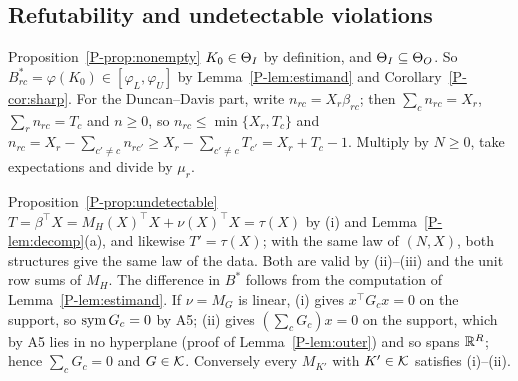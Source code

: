 \subsection{Refutability and undetectable violations}

\begin{proofof}{Proposition~\ref{P-prop:nonempty}}
$K_0\in\Theta_I$ by definition, and $\Theta_I\subseteq\Theta_O$. So
$B^*_{rc}=\varphi(K_0)\in[\varphi_L,\varphi_U]$ by Lemma~\ref{P-lem:estimand} and
Corollary~\ref{P-cor:sharp}. For the Duncan--Davis part, write $n_{rc}=X_r\beta_{rc}$;
then $\sum_cn_{rc}=X_r$, $\sum_rn_{rc}=T_c$ and $n\ge0$, so $n_{rc}\le\min\{X_r,T_c\}$
and $n_{rc}=X_r-\sum_{c'\ne c}n_{rc'}\ge X_r-\sum_{c'\ne c}T_{c'}=X_r+T_c-1$. Multiply
by $N\ge0$, take expectations and divide by $\mu_r$.
\end{proofof}

\begin{proofof}{Proposition~\ref{P-prop:undetectable}}
$T=\beta^\top X=M_H(X)^\top X+\nu(X)^\top X=\tau(X)$ by (i) and
Lemma~\ref{P-lem:decomp}(a), and likewise $T'=\tau(X)$; with the same law of $(N,X)$,
both structures give the same law of the data. Both are valid by (ii)--(iii) and the
unit row sums of $M_H$. The difference in $B^*$ follows from the computation of
Lemma~\ref{P-lem:estimand}. If $\nu=M_G$ is linear, (i) gives $x^\top G_cx=0$ on
the support, so $\operatorname{sym} G_c=0$ by A5; (ii) gives $(\sum_cG_c)x=0$ on the
support, which by A5 lies in no hyperplane (proof of Lemma~\ref{P-lem:outer}) and so
spans $\mathbb R^R$; hence $\sum_cG_c=0$ and $G\in\mathcal K$. Conversely every
$M_{K'}$ with $K'\in\mathcal K$ satisfies (i)--(ii).
\end{proofof}
